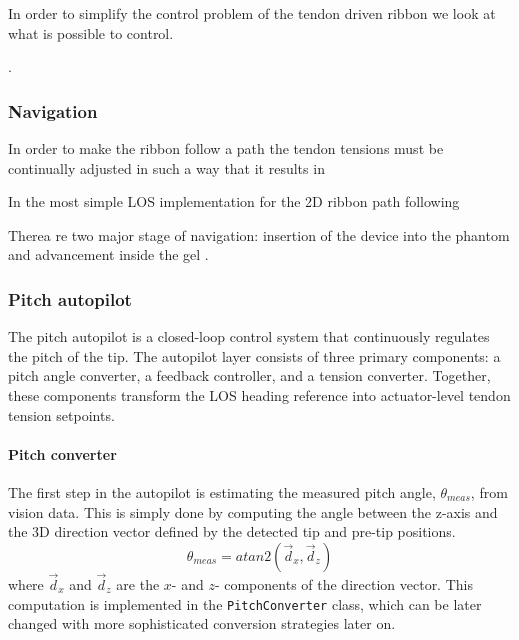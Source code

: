 
In order to simplify the control problem of the tendon driven ribbon we look at what is possible to control. 



.

\subsubsection{Navigation}
In order to make the ribbon follow a path the tendon tensions must be continually adjusted in such a way that it results in 

In the most simple LOS implementation for the 2D ribbon path following 

Therea re two major stage of navigation: insertion of the device into the phantom and advancement inside the gel \cite{noseda_flat_2024}. 

\subsubsection{Pitch autopilot}
The pitch autopilot is a closed-loop control system that continuously regulates the pitch of the tip. The autopilot layer consists of three primary components: a pitch angle converter, a feedback controller, and a tension converter. Together, these components transform the LOS heading reference into actuator-level tendon tension setpoints.


\paragraph*{Pitch converter}
The first step in the autopilot is estimating the measured pitch angle, \(\theta_{meas}\), from vision data. This is simply done by computing the angle between the z-axis and the 3D direction vector defined by the detected tip and pre-tip positions. 
\begin{equation}
    \theta_{meas} = atan2(\vec{d}_x,\vec{d}_z)
\end{equation}
where \(\vec{d}_x\) and \(\vec{d}_z\) are the \(x\)- and \(z\)- components of the direction vector. This computation is implemented in the \texttt{PitchConverter} class,  which can be later changed with more sophisticated conversion strategies later on.

